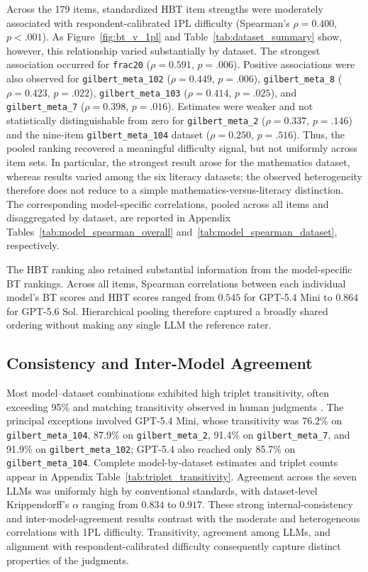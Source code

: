 \documentclass[11pt]{article}
\begin{document}
Across the 179 items, standardized HBT item strengths were moderately associated with respondent-calibrated 1PL difficulty (Spearman's $\rho=0.400$, $p<.001$). As Figure~\ref{fig:bt_v_1pl} and Table~\ref{tab:dataset_summary} show, however, this relationship varied substantially by dataset. The strongest association occurred for \texttt{frac20} ($\rho=0.591$, $p=.006$). Positive associations were also observed for \texttt{gilbert\_meta\_102} ($\rho=0.449$, $p=.006$), \texttt{gilbert\_meta\_8} ($\rho=0.423$, $p=.022$), \texttt{gilbert\_meta\_103} ($\rho=0.414$, $p=.025$), and \texttt{gilbert\_meta\_7} ($\rho=0.398$, $p=.016$). Estimates were weaker and not statistically distinguishable from zero for \texttt{gilbert\_meta\_2} ($\rho=0.337$, $p=.146$) and the nine-item \texttt{gilbert\_meta\_104} dataset ($\rho=0.250$, $p=.516$). Thus, the pooled ranking recovered a meaningful difficulty signal, but not uniformly across item sets. In particular, the strongest result arose for the mathematics dataset, whereas results varied among the six literacy datasets; the observed heterogeneity therefore does not reduce to a simple mathematics-versus-literacy distinction. The corresponding model-specific correlations, pooled across all items and disaggregated by dataset, are reported in Appendix Tables~\ref{tab:model_spearman_overall} and~\ref{tab:model_spearman_dataset}, respectively.

The HBT ranking also retained substantial information from the model-specific BT rankings. Across all items, Spearman correlations between each individual model's BT scores and HBT scores ranged from $0.545$ for GPT-5.4 Mini to $0.864$ for GPT-5.6 Sol. Hierarchical pooling therefore captured a broadly shared ordering without making any single LLM the reference rater.

\subsection{Consistency and Inter-Model Agreement}

Most model--dataset combinations exhibited high triplet transitivity, often exceeding 95\% and matching transitivity observed in human judgments \citep{slebodaMeasurementsRationalityIndividual2017}. The principal exceptions involved GPT-5.4 Mini, whose transitivity was 76.2\% on \texttt{gilbert\_meta\_104}, 87.9\% on \texttt{gilbert\_meta\_2}, 91.4\% on \texttt{gilbert\_meta\_7}, and 91.9\% on \texttt{gilbert\_meta\_102}; GPT-5.4 also reached only 85.7\% on \texttt{gilbert\_meta\_104}. Complete model-by-dataset estimates and triplet counts appear in Appendix Table~\ref{tab:triplet_transitivity}. Agreement across the seven LLMs was uniformly high by conventional standards, with dataset-level Krippendorff's $\alpha$ ranging from $0.834$ to $0.917$. These strong internal-consistency and inter-model-agreement results contrast with the moderate and heterogeneous correlations with 1PL difficulty. Transitivity, agreement among LLMs, and alignment with respondent-calibrated difficulty consequently capture distinct properties of the judgments.
\end{document}
